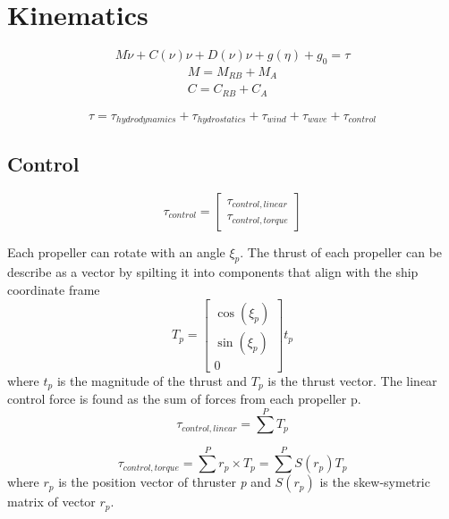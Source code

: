\documentclass[12pt,a4]{article}
\begin{document}
\section{Kinematics}
\begin{equation}
    M \dot{\nu} + C(\nu)\nu + D(\nu)\nu + g(\eta) + g_0 = \tau
\end{equation}
\begin{align*}
    M  = M_{RB} + M_A   \\
    C  = C_{RB} + C_A
\end{align*}

\begin{equation}
    \tau = \tau_{hydrodynamics}+\tau_{hydrostatics}+\tau_{wind}+\tau_{wave}+\tau_{control}
\end{equation}


\subsection{Control}
\begin{equation}
    \tau_{control} = \begin{bmatrix}
    \tau_{control,linear}\\
    \tau_{control,torque}
    \end{bmatrix}
\end{equation}

Each propeller can rotate with an angle $\xi_p$. The thrust of each propeller can be describe as a vector by spilting it into components that align with the ship coordinate frame
\begin{equation}
    T_p = \begin{bmatrix} \cos(\xi_p)\\ \sin(\xi_p)\\ 0 \end{bmatrix} t_p
\end{equation}
where $t_p$ is the magnitude of the thrust and $T_p$ is the thrust vector.
The linear control force is found as the sum of forces from each propeller p.
\begin{equation}
    \tau_{control,linear} = \sum^P T_p
\end{equation}

\begin{equation}
    \tau_{control,torque} = \sum^P  r_p \times T_p = \sum^P S(r_p) T_p
\end{equation}
where $r_p$ is the position vector of thruster \textit{p} and $S(r_p)$ is the skew-symetric matrix of vector $r_p$.
\end{document}
